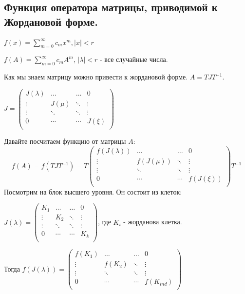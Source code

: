\subsection{Функция оператора матрицы, приводимой к Жордановой форме.}

$f(x) = \sum\limits_{m = 0}^{\infty}c_m x^m, |x|< r$ 

$f(A) = \sum\limits_{m=0}^{\infty}c_m A^m$, $|\lambda|< r$ - все случайные числа.

Как мы знаем матрицу можно привести к жордановой форме. $A = TJT^{-1}$.

$J = \begin{pmatrix}
    J(\lambda) & \ldots & \ldots & 0 \\
    \vdots & J(\mu) & \ddots & \vdots\\
    \vdots & \ddots & \ddots & \vdots\\
    0 & \cdots & \cdots & J(\xi)\\
\end{pmatrix}$

Давайте посчитаем функцию от матрицы $A$:
$$f(A) = f(TJT^{-1}) = T \begin{pmatrix}
    f(J(\lambda)) & \ldots & \ldots & 0 \\
    \vdots & f(J(\mu)) & \ddots & \vdots\\
    \vdots & \ddots & \ddots & \vdots\\
    0 & \cdots & \cdots & f(J(\xi))\\
\end{pmatrix} T^{-1}$$
Посмотрим на блок высшего уровня. Он состоит из клеток:

$J(\lambda ) = \begin{pmatrix}
    K_1 & \ldots & \ldots & 0 \\
    \vdots & K_2 & \ddots & \vdots\\
    \vdots & \ddots & \ddots & \vdots\\
    0 & \cdots & \cdots & K_k\\
\end{pmatrix}$, где $K_i$ - жорданова клетка.

Тогда $f(J(\lambda)) = \begin{pmatrix}
   f(K_1) & \ldots & \ldots & 0 \\
    \vdots & f(K_2) & \ddots & \vdots\\
    \vdots & \ddots & \ddots & \vdots\\
    0 & \cdots & \cdots & f(K_{ind})\\
\end{pmatrix}$


